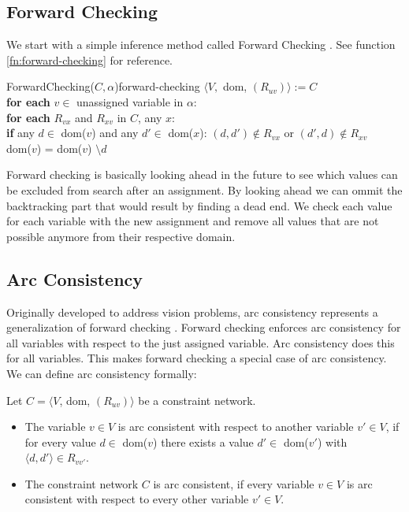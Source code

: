 \subsection{Forward Checking}

We start with a simple inference method called Forward Checking \cite{forward_checking:1980}. See function \ref{fn:forward-checking} for reference. \\

\begin{function}{ForwardChecking($C, \alpha$)}{forward-checking}
	$\langle V,$ dom, $(R_{uv})\rangle := C$ \\
	\textbf{for each} $v \in $ unassigned variable in $\alpha$: \\
	\null \qquad \textbf{for each} $R_{vx}$ and $R_{xv}$ in $C$, any $x$: \\
	\null \qquad \qquad \textbf{if} any $d \in$ dom($v$) and any $d' \in$ dom($x$): $(d, d') \notin R_{vx}$ or $(d', d) \notin R_{xv}$ \\
	\null \qquad \qquad \qquad dom($v$) = dom($v$) $\setminus d$
\end{function}

Forward checking is basically looking ahead in the future to see which values can be excluded from search after an assignment. By looking ahead we can ommit the backtracking part that would result by finding a dead end. We check each value for each variable with the new assignment and remove all values that are not possible anymore from their respective domain.

\subsection{Arc Consistency}

Originally developed to address vision problems, arc consistency represents a generalization of forward checking \cite{original_arc:1988}. Forward checking enforces arc consistency for all variables with respect to the just assigned variable. Arc consistency does this for all variables. This makes forward checking a special case of arc consistency. We can define arc consistency formally:

\begin{tcolorbox}
	Let $C = \langle V$, dom, $(R_{uv})\rangle$ be a constraint network.
	\begin{itemize}
		\item The variable $v \in V$ is arc consistent with respect to another variable $v'\in V$, if for every value $d \in$ dom($v$) there exists a value $d' \in$ dom($v'$) with $\langle d, d' \rangle \in R_{vv'}$.
		\item The constraint network $C$ is arc consistent, if every variable $v \in V$ is arc consistent with respect to every other variable $v' \in V$.
	\end{itemize}
\end{tcolorbox}

